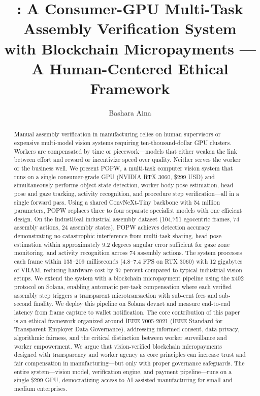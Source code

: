 \documentclass[10pt,twocolumn]{article}
\title{\popw: A Consumer-GPU Multi-Task Assembly Verification System \\
with Blockchain Micropayments — \\
A Human-Centered Ethical Framework}
\author{Bashara Aina}
\date{}
\newcommand{\popw}{POPW}
\newcommand{\industreal}{IndustReal}
\begin{document}
\maketitle

\begin{abstract}
Manual assembly verification in manufacturing relies on human supervisors or expensive multi-model vision systems requiring ten-thousand-dollar GPU clusters. Workers are compensated by time or piecework---models that either weaken the link between effort and reward or incentivize speed over quality. Neither serves the worker or the business well. We present \popw, a multi-task computer vision system that runs on a single consumer-grade GPU (NVIDIA RTX 3060, \$299 USD) and simultaneously performs object state detection, worker body pose estimation, head pose and gaze tracking, activity recognition, and procedure step verification---all in a single forward pass. Using a shared ConvNeXt-Tiny backbone with 54 million parameters, \popw{} replaces three to four separate specialist models with one efficient design. On the \industreal{} industrial assembly dataset (104,751 egocentric frames, 74 assembly actions, 24 assembly states), \popw{} achieves detection accuracy demonstrating no catastrophic interference from multi-task sharing, head pose estimation within approximately 9.2 degrees angular error sufficient for gaze zone monitoring, and activity recognition across 74 assembly actions. The system processes each frame within 135--209 milliseconds (4.8--7.4 FPS on RTX 3060) with 12 gigabytes of VRAM, reducing hardware cost by 97 percent compared to typical industrial vision setups. We extend the system with a blockchain micropayment pipeline using the x402 protocol on Solana, enabling automatic per-task compensation where each verified assembly step triggers a transparent microtransaction with sub-cent fees and sub-second finality. We deploy this pipeline on Solana devnet and measure end-to-end latency from frame capture to wallet notification. The core contribution of this paper is an ethical framework organized around IEEE 7005-2021 (IEEE Standard for Transparent Employer Data Governance), addressing informed consent, data privacy, algorithmic fairness, and the critical distinction between worker surveillance and worker empowerment. We argue that vision-verified blockchain micropayments designed with transparency and worker agency as core principles can increase trust and fair compensation in manufacturing---but only with proper governance safeguards. The entire system---vision model, verification engine, and payment pipeline---runs on a single \$299 GPU, democratizing access to AI-assisted manufacturing for small and medium enterprises.
\end{abstract}
\end{document}
